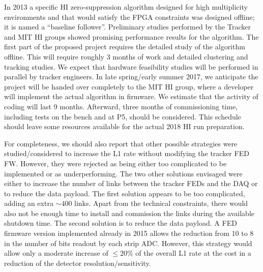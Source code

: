 In 2013 a specific HI zero-suppression algorithm designed for high multiplicity environments and that would satisfy the FPGA constraints was designed offline; it is named a ``baseline follower''.  Preliminary studies performed by the Tracker and MIT HI groups showed promising performance results for the algorithm. The first part of the proposed project requires the detailed study of the algorithm offline. This will require roughly 3 months of work and detailed clustering and tracking studies. We expect that hardware feasibility studies will be performed in parallel by tracker engineers. In late spring/early summer 2017, we anticipate the project will be handed over completely to the MIT HI group, where a developer will implement the actual algorithm in firmware. We estimate that the activity of coding will last 9 months. Afterward, three months of commissioning time, including tests on the bench and at P5, should be considered. This schedule should leave some resources available for the actual 2018 HI run preparation. 

For completeness, we should also report that other possible strategies were studied/considered to increase the L1 rate without modifying the tracker FED FW. However, they were rejected as being either too complicated to be implemented or as underperforming. The two other solutions envisaged were either to increase the number of links between the tracker FEDs and the DAQ or to reduce the data payload. The first solution appears to be too complicated, adding an extra $\sim 400$ links. Apart from the technical constraints, there would also not be enough time to install and commission the links during the available shutdown time. The second solution is to reduce the data payload. A FED firmware version implemented already in 2015 allows the reduction from 10 to 8 in the number of bits readout by each strip ADC. However, this strategy would allow only a moderate increase of $\le 20 \%$ of the overall L1 rate at the cost in a reduction of the detector resolution/sensitivity. 

